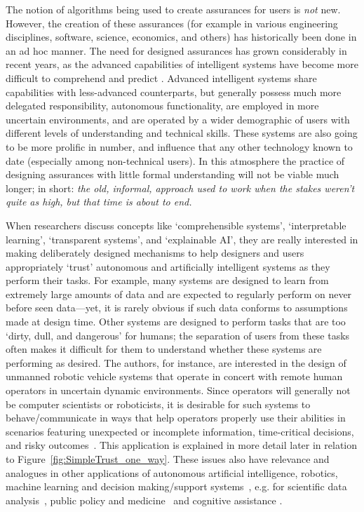 The notion of algorithms being used to create assurances for users is \emph{not} new. However, the creation of these assurances (for example in various engineering disciplines, software, science, economics, and others) has historically been done in an ad hoc manner. The need for designed assurances has grown considerably in recent years, as the advanced capabilities of intelligent systems have become more difficult to comprehend and predict \cite{Doshi-Velez2017-xy, Weller2017-zx, Lipton2016-ug, Gunning2017-ih}. Advanced intelligent systems share capabilities with less-advanced counterparts, but generally possess much more delegated responsibility, autonomous functionality, are employed in more uncertain environments, and are operated by a wider demographic of users with different levels of understanding and technical skills. These systems are also going to be more prolific in number, and influence that any other technology known to date (especially among non-technical users). In this atmosphere the practice of designing assurances with little formal understanding will not be viable much longer; in short: \emph{the old, informal, approach used to work when the stakes weren't quite as high, but that time is about to end.}

When researchers discuss concepts like `comprehensible systems', `interpretable learning', `transparent systems', and `explainable AI', they are really interested in making deliberately designed mechanisms to help designers and users appropriately `trust' autonomous and artificially intelligent systems as they perform their tasks. 
For example, many systems are designed to learn from extremely large amounts of data and are expected to regularly perform on never before seen data---yet, it is rarely obvious if such data conforms to assumptions made at design time. 
Other systems are designed to perform tasks that are too `dirty, dull, and dangerous' for humans; the separation of users from these tasks often makes it difficult for them to understand whether these systems are performing as desired. 
The authors, for instance, are interested in the design of unmanned robotic vehicle systems that operate in concert with remote human operators in uncertain dynamic environments. 
Since operators will generally not be computer scientists or roboticists, it is desirable for such systems to behave/communicate in ways that help operators properly use their abilities in scenarios featuring unexpected or incomplete information, time-critical decisions, and risky outcomes~\cite{Hutchins2015-if, Sweet2016-tz}. 
This application is explained in more detail later in relation to Figure~\ref{fig:SimpleTrust_one_way}. 
These issues also have relevance and analogues in other applications of autonomous artificial intelligence, robotics, machine learning and decision making/support systems~\cite{Garcia2015-rs,Otte2013-oo,Sugiyama2013-ci,Amodei2016-xi}, e.g. for scientific data analysis~\cite{Faghmous2014-og}, public policy and medicine~\cite{Wagner2016-ck,Jovanovic2016-gw} and cognitive assistance \cite{Gutfreund2016-xe}.

